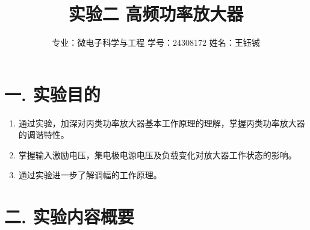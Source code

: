 \documentclass[12pt]{article}
\title{\Huge \textbf{实验二 高频功率放大器}}
\author{专业：微电子科学与工程 \quad 学号：24308172 \quad 姓名：王钰铖}
\date{}
\begin{document}
\maketitle

\section*{一. 实验目的}
\begin{enumerate}
    \item 通过实验，加深对丙类功率放大器基本工作原理的理解，掌握丙类功率放大器的调谐特性。
    \item 掌握输入激励电压，集电极电源电压及负载变化对放大器工作状态的影响。
    \item 通过实验进一步了解调幅的工作原理。
\end{enumerate}

\section*{二. 实验内容概要}
\end{document}
